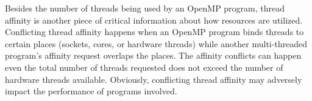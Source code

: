 Besides the number of threads being used by an OpenMP program, thread affinity is another piece of critical 
information about how resources are utilized. 
Conflicting thread affinity happens when an OpenMP program binds threads to certain places (sockets, cores, or hardware threads)
while another multi-threaded program's affinity request overlaps the places.
The affinity conflicts can happen even the total number of threads requested does not exceed the number of hardware threads available.
Obviously, conflicting thread affinity may adversely impact the performance of programs involved. 

